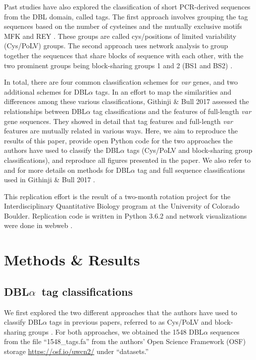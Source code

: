 \documentclass[10pt,twocolumn,superscriptaddress]{revtex4-1}
\newcommand{\var}{{\it var}\xspace}
\newcommand{\dbla}{{DBL$\alpha$}\xspace}
\newcommand{\cp}{{Cys/PoLV}\xspace}
\newcommand{\paper}{{Githinji \& Bull}\xspace}
\begin{document}
Past studies have also explored the classification of short PCR-derived sequences from the DBL domain, called tags. The first approach involves grouping the tag sequences based on the number of cysteines and the mutually exclusive motifs MFK and REY \cite{bull2007}. These groups are called cys/positions of limited variability (\cp) groups. The second approach uses network analysis to group together the sequences that share blocks of sequence with each other, with the two prominent groups being block-sharing groups 1 and 2 (BS1 and BS2) \cite{bull2008}.  

In total, there are four common classification schemes for \var genes, and two additional schemes for \dbla tags. In an effort to map the similarities and differences among these various classifications, \paper 2017 \cite{githinji2017} assessed the relationships between \dbla tag classifications and the features of full-length \var gene sequences. They showed in detail that tag features and full-length \var features are mutually related in various ways. Here, we aim to reproduce the results of this paper, provide open Python code \cite{github} for the two approaches the authors have used to classify the \dbla tags (\cp and block-sharing group classifications), and reproduce all figures presented in the paper. We also refer to \cite{bull2008, bull2007} and \cite{rask2010} for more details on methods for \dbla tag and full sequence classifications used in \paper 2017 \cite{githinji2017}. 

This replication effort is the result of a two-month rotation project for the Interdisciplinary Quantitative Biology program at the University of Colorado Boulder. Replication code is written in Python 3.6.2 \cite{github} and network visualizations were done in webweb \cite{webweb}. 


\section{Methods \& Results}

\subsection{\dbla\ tag classifications}
We first explored the two different approaches that the authors have used to classify \dbla tags in previous papers, referred to as \cp \cite{bull2007} and block-sharing groups \cite{bull2008}. For both approaches, we obtained the 1548 \dbla sequences from the file ``1548\_tags.fa'' from the authors' Open Science Framework (OSF) storage \url{https://osf.io/uwcn2/} under ``datasets.''  
\end{document}
